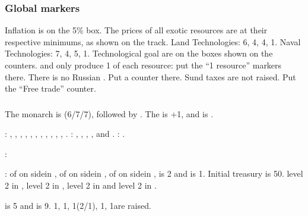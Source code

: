 \subsubsection{Global markers}
\aparag Inflation is on the 5\% box.
\aparag The prices of all exotic resources are at their respective minimums,
as shown on the track.
\aparag Land Technologies:  6,  4, 
4,  1. Naval Technologies:  7,  4,
 5,  1.
\bparag Technological goal are on the boxes shown on the counters.
\aparag \granderegionKarnatika and \granderegionBengale only produce 1 of each
resource: put the ``1 resource'' markers there.
\aparag There is no Russian \CTZ. Put a counter there.
\aparag Sund taxes are not raised. Put the ``Free trade'' counter.

\subsubsection{\paysmajeurAngleterre}
\aparag The monarch is  (6/7/7), followed by
. The \STAB is +1, and \ANG is .

: \provinceCumberland, \provinceDurham,
\provinceYorkshire, \provinceLancashire, \provinceCymru, \provinceMidlands,
\provinceLincolnshire, , \provinceGloucester,
\provinceCornwall, \provinceWessex, \provinceKent.
: \provinceConnacht, \provinceMumhan,
\provinceLaighean, \provinceBrega, \provinceUladh and \provinceCalais.
: \seazoneAcores.

:
\begin{modlist}
\item[\VASSAL] \paysEcosse
\end{modlist}

:
\bparag \MNU of  on side\facemoins in \provinceMidlands, \MNU of
 on side\facemoins in , \MNU of  on
side\facemoins in \provinceWessex, \FTI is 2 and \DTI is 1.
\bparag Initial treasury is 50\ducats.
\bparag \TradeFLEET level 2 in , level 2 in , level
2 in  and level 2 in .

\aparag {} is 5 and  is
9. 1\ARMY\facemoins, 1\LD, 1\FLEET\facemoins (2\NWD/1\NTD), 1\ND, 1\NTD are
raised.


